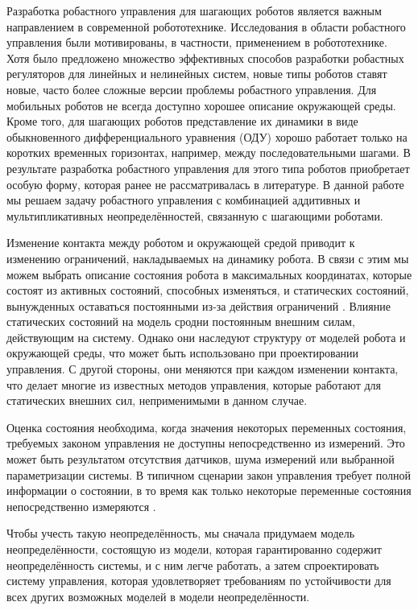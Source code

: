 Разработка робастного управления для шагающих роботов является важным направлением в современной робототехнике. Исследования в области робастного управления были мотивированы, в частности, применением в робототехнике. Хотя было предложено множество эффективных способов разработки робастных регуляторов для линейных \cite{POLYAK2021,Nicolett2018} и нелинейных \cite{HAUSWIRTH2024,Celentano2018} систем, новые типы роботов ставят новые, часто более сложные версии проблемы робастного управления. Для мобильных роботов не всегда доступно хорошее описание окружающей среды. Кроме того, для шагающих роботов представление их динамики в виде обыкновенного дифференциального уравнения (ОДУ) хорошо работает только на коротких временных горизонтах, например, между последовательными шагами. В результате разработка робастного управления для этого типа роботов приобретает особую форму, которая ранее не рассматривалась в литературе. В данной работе мы решаем задачу робастного управления с комбинацией аддитивных и мультипликативных неопределённостей, связанную с шагающими роботами.

Изменение контакта между роботом и окружающей средой приводит к изменению ограничений, накладываемых на динамику робота. В связи с этим мы можем выбрать описание состояния робота в максимальных координатах, которые состоят из активных состояний, способных изменяться, и статических состояний, вынужденных оставаться постоянными из-за действия ограничений \cite{SAVIN2021}. Влияние статических состояний на модель сродни постоянным внешним силам, действующим на систему. Однако они наследуют структуру от моделей робота и окружающей среды, что может быть использовано при проектировании управления. С другой стороны, они меняются при каждом изменении контакта, что делает многие из известных методов управления, которые работают для статических внешних сил, неприменимыми в данном случае.

Оценка состояния необходима, когда значения некоторых переменных состояния, требуемых законом управления не доступны непосредственно из измерений. Это может быть результатом отсутствия датчиков, шума измерений или выбранной параметризации системы. В типичном сценарии закон управления требует полной информации о состоянии, в то время как только некоторые переменные состояния непосредственно измеряются \cite{Ackermann2001}.

Чтобы учесть такую неопределённость, мы сначала придумаем модель неопределённости, состоящую из модели, которая гарантированно содержит неопределённость системы, и с ним легче работать, а затем спроектировать систему управления, которая удовлетворяет требованиям по устойчивости для всех других возможных моделей в модели неопределённости.

